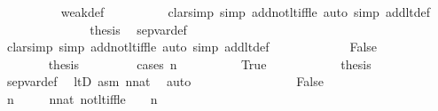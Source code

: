 \begin{isabellebody}
\ \ \ \ \ \ \ \ \isamarkupfalse%
\ weak{\isacharunderscore}{\kern0pt}def\isanewline
\ \ \ \ \ \ \ \ \isamarkupfalse%
\ {\isacharparenleft}{\kern0pt}clarsimp\ simp\ add{\isacharcolon}{\kern0pt}not{\isacharunderscore}{\kern0pt}lt{\isacharunderscore}{\kern0pt}iff{\isacharunderscore}{\kern0pt}le{\isacharcomma}{\kern0pt}\ auto\ simp\ add{\isacharcolon}{\kern0pt}lt{\isacharunderscore}{\kern0pt}def{\isacharparenright}{\kern0pt}\isanewline
\ \ \ \ \ \ \isamarkupfalse%
\isanewline
\ \ \ \ \ \ \isamarkupfalse%
\ {\isacharquery}{\kern0pt}thesis\ \isamarkupfalse%
\ sep{\isacharunderscore}{\kern0pt}var{\isacharunderscore}{\kern0pt}def\ \isanewline
\ \ \ \ \ \ \ \ \isamarkupfalse%
\ {\isacharparenleft}{\kern0pt}clarsimp\ simp\ add{\isacharcolon}{\kern0pt}not{\isacharunderscore}{\kern0pt}lt{\isacharunderscore}{\kern0pt}iff{\isacharunderscore}{\kern0pt}le{\isacharcomma}{\kern0pt}\ auto\ simp\ add{\isacharcolon}{\kern0pt}lt{\isacharunderscore}{\kern0pt}def{\isacharparenright}{\kern0pt}\isanewline
\ \ \ \ \isamarkupfalse%
\isanewline
\ \ \ \ \ \ \isamarkupfalse%
\ False\ \isanewline
\ \ \ \ \ \ \isamarkupfalse%
\ \isanewline
\ \ \ \ \ \ \isamarkupfalse%
\ {\isacharquery}{\kern0pt}thesis\ \isanewline
\ \ \ \ \ \ \isamarkupfalse%
\ {\isacharparenleft}{\kern0pt}cases\ {\isachardoublequoteopen}n{\isacharequal}{\kern0pt}{}{\isachardoublequoteclose}{\isacharparenright}{\kern0pt}\isanewline
\ \ \ \ \ \ \ \ \isamarkupfalse%
\ True\isanewline
\ \ \ \ \ \ \ \ \isamarkupfalse%
\ \isamarkupfalse%
\ {\isacharquery}{\kern0pt}thesis\ \isanewline
\ \ \ \ \ \ \ \ \ \ \isamarkupfalse%
\ sep{\isacharunderscore}{\kern0pt}var{\isacharunderscore}{\kern0pt}def\ \isamarkupfalse%
\ ltD\ asm\ {\isacartoucheopen}n{\isasymin}nat{\isacartoucheclose}\ \isamarkupfalse%
\ auto\isanewline
\ \ \ \ \ \ \isamarkupfalse%
\isanewline
\ \ \ \ \ \ \ \ \isamarkupfalse%
\ False\isanewline
\ \ \ \ \ \ \ \ \isamarkupfalse%
\ \isanewline
\ \ \ \ \ \ \ \ \isamarkupfalse%
\ {\isachardoublequoteopen}n\ {\isacharless}{\kern0pt}\ {}{\isachardoublequoteclose}\ \isamarkupfalse%
\ \ {\isacartoucheopen}n{\isasymin}nat{\isacartoucheclose}\ not{\isacharunderscore}{\kern0pt}lt{\isacharunderscore}{\kern0pt}iff{\isacharunderscore}{\kern0pt}le\ {\isacartoucheopen}{\isasymnot}\ {}\ {\isasymle}\ n{\isacartoucheclose}\ \ \isamarkupfalse%

\end{isabellebody}
